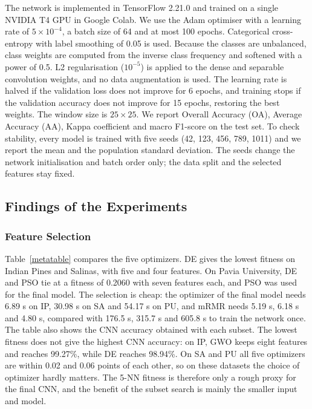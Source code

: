 \documentclass[conference]{IEEEtran}
\begin{document}
	The network is implemented in TensorFlow 2.21.0 and trained on a single NVIDIA T4 GPU in Google Colab. We use the Adam optimiser\cite{adam} with a learning rate of $5\times10^{-4}$, a batch size of 64 and at most 100 epochs. Categorical cross-entropy with label smoothing of 0.05\cite{labelsmooth} is used. Because the classes are unbalanced, class weights are computed from the inverse class frequency and softened with a power of 0.5. L2 regularisation ($10^{-5}$) is applied to the dense and separable convolution weights, and no data augmentation is used. The learning rate is halved if the validation loss does not improve for 6 epochs, and training stops if the validation accuracy does not improve for 15 epochs, restoring the best weights. The window size is $25\times25$. We report Overall Accuracy (OA), Average Accuracy (AA), Kappa coefficient and macro F1-score on the test set. To check stability, every model is trained with five seeds (42, 123, 456, 789, 1011) and we report the mean and the population standard deviation. The seeds change the network initialisation and batch order only; the data split and the selected features stay fixed.
	
	\subsection{Findings of the Experiments}
	
	\subsubsection{Feature Selection}
	Table~\ref{metatable} compares the five optimizers. DE gives the lowest fitness on Indian Pines and Salinas, with five and four features. On Pavia University, DE and PSO tie at a fitness of 0.2060 with seven features each, and PSO was used for the final model. The selection is cheap: the optimizer of the final model needs 6.89 s on IP, 30.98 s on SA and 54.17 s on PU, and mRMR needs 5.19 s, 6.18 s and 4.80 s, compared with 176.5 s, 315.7 s and 605.8 s to train the network once. The table also shows the CNN accuracy obtained with each subset. The lowest fitness does not give the highest CNN accuracy: on IP, GWO keeps eight features and reaches 99.27\%, while DE reaches 98.94\%. On SA and PU all five optimizers are within 0.02 and 0.06 points of each other, so on these datasets the choice of optimizer hardly matters. The 5-NN fitness is therefore only a rough proxy for the final CNN, and the benefit of the subset search is mainly the smaller input and model.
	
\end{document}
